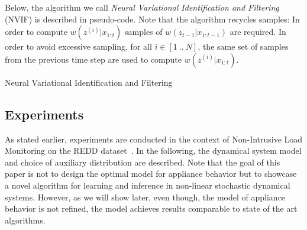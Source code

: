 Below, the algorithm we call \emph{Neural Variational Identification and Filtering} (NVIF) is described in pseudo-code. Note that the algorithm recycles samples: In order to compute $w(z^{(i)}|x_{1:t})$ samples of $w(z_{t-1}|x_{1:t-1})$ are required. In order to avoid excessive sampling, for all $i \in [1\ ..\ N]$, the same set of samples from the previous time step are used to compute $w(z^{(i)}|x_{1:t})$.

\begin{algorithm}


\caption{Neural Variational Identification and Filtering}
\end{algorithm}



\subsection{Experiments}
\label{sec:expmts}

As stated earlier, experiments are conducted in the context of Non-Intrusive Load Monitoring on the REDD dataset~\cite{kolter2011redd}. In the following, the dynamical system model and choice of auxiliary distribution are described. Note that the goal of this paper is not to design the optimal model for appliance behavior but to showcase a novel algorithm for learning and inference in non-linear stochastic dynamical systems. However, as we will show later, even though, the model of appliance behavior is not refined, the model achieves results comparable to state of the art algorithms. 

